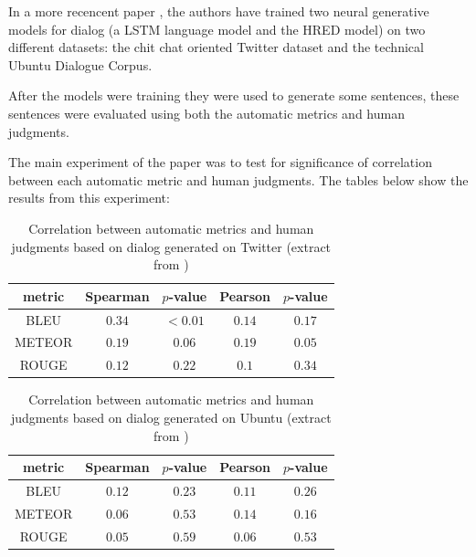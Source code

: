 In a more recencent paper \cite{LiuLSNCP16}, the authors have trained two neural generative models for dialog (a LSTM language model and the HRED model) on two different datasets: the chit chat oriented Twitter dataset and the technical Ubuntu Dialogue Corpus.

After the models were training they were used to generate some sentences, these sentences were evaluated using both the automatic metrics and human judgments. 

The main experiment of the paper was to test for significance of correlation between each automatic metric and  human judgments. The tables below show the results from this experiment:

\begin{table}[h]
\centering
\label{hownottable}
\begin{tabular}{|c|c|c|c|c|}
\hline
\cellcolor{blue!10} metric & \cellcolor{blue!10} Spearman & \cellcolor{blue!10} $p$-value & \cellcolor{blue!10} Pearson &  \cellcolor{blue!10} $p$-value \\ \hline
BLEU   & $0.34$   & $< 0.01$  & $0.14$  & $0.17$ \\ \hline
METEOR & $0.19$   & $0.06$    & $0.19$  & $0.05$ \\ \hline
ROUGE  & $0.12$   & $0.22$    & $0.1$   & $0.34$ \\ \hline  
\end{tabular}
\caption{Correlation between automatic metrics and human judgments based on dialog generated on Twitter
(extract from \cite{LiuLSNCP16})}
\end{table}


\begin{table}[h]
\centering
\label{hownottable}
\begin{tabular}{|c|c|c|c|c|}
\hline
\cellcolor{blue!10} metric & \cellcolor{blue!10} Spearman & \cellcolor{blue!10} $p$-value & \cellcolor{blue!10} Pearson &  \cellcolor{blue!10} $p$-value \\ \hline
BLEU & $0.12$   & $0.23$    & $0.11$  & $0.26$    \\ \hline
METEOR & $0.06$   & $0.53$    & $0.14$  & $0.16$     \\ \hline
ROUGE & $0.05$   & $0.59$    & $0.06$  & $0.53$    \\ \hline
\end{tabular}
\caption{Correlation between automatic metrics and human judgments based on dialog generated on Ubuntu (extract from \cite{LiuLSNCP16})}
\end{table}

